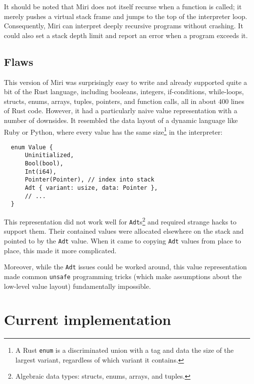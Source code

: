 \documentclass[twocolumn]{article}
\newcommand{\rust}[1]{\texttt{#1}}
\begin{document}
It should be noted that Miri does not itself recurse when a function is called; it merely pushes a
virtual stack frame and jumps to the top of the interpreter loop. Consequently, Miri can interpret
deeply recursive programs without crashing. It could also set a stack depth limit and report an
error when a program exceeds it.

\subsection{Flaws}

This version of Miri was surprisingly easy to write and already supported quite a bit of the Rust
language, including booleans, integers, if-conditions, while-loops, structs, enums, arrays, tuples,
pointers, and function calls, all in about 400 lines of Rust code. However, it had a particularly
naive value representation with a number of downsides. It resembled the data layout of a dynamic
language like Ruby or Python, where every value has the same size\footnote{A Rust \rust{enum} is a
discriminated union with a tag and data the size of the largest variant, regardless of which variant
it contains.} in the interpreter:

\begin{verbatim}
  enum Value {
      Uninitialized,
      Bool(bool),
      Int(i64),
      Pointer(Pointer), // index into stack
      Adt { variant: usize, data: Pointer },
      // ...
  }
\end{verbatim}

This representation did not work well for \rust{Adt}s\footnote{Algebraic data types: structs, enums,
arrays, and tuples.} and required strange hacks to support them. Their contained values were
allocated elsewhere on the stack and pointed to by the \rust{Adt} value. When it came to copying
\rust{Adt} values from place to place, this made it more complicated.

Moreover, while the \rust{Adt} issues could be worked around, this value representation made common
\rust{unsafe} programming tricks (which make assumptions about the low-level value layout)
fundamentally impossible.


\section{Current implementation}
\end{document}
